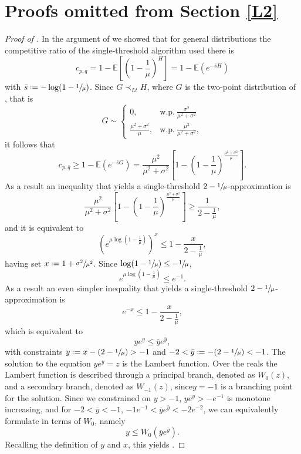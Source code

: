 \documentclass[11pt, a4paper, twoside]{article}
\newcommand*{\defeq}{\mathrel{\vcenter{\baselineskip0.5ex \lineskiplimit0pt
			\hbox{\scriptsize.}\hbox{\scriptsize.}}}=}
\newcommand{\EE}{\mathbb{E}}
\numberwithin{equation}{section}
\begin{document}
	\section{Proofs omitted from Section \ref{L2}}\label{suppL2}
	\begin{proof}[Proof of ]
		In the argument of  we showed that for general distributions the competitive ratio of the single-threshold algorithm used there is \[c_{p,\bar{q}}=1-\EE\left[\left(1-\frac{1}{\mu}\right)^H\right]=1-\EE\left( e^{-\bar{s}H}\right)\] with $\bar{s}\defeq-\log(1-\sfrac{1}{\mu})$. Since $G\prec_{Lt}H$, where $G$ is the two-point distribution of , that is
		\[G\sim\begin{cases}0,&\text{w.p.}\:\frac{\sigma^2}{\mu^2+\sigma^2}\\
			\frac{\mu^2+\sigma^2}{\mu},&\text{w.p.}\:\frac{\mu^2}{\mu^2+\sigma^2},\end{cases}\]
		it follows that
		\[c_{p,\bar{q}}\ge1-\EE\left( e^{-\bar{s}G}\right)=\frac{\mu^2}{\mu^2+\sigma^2}\left[1-\left(1-\frac{1}{\mu}\right)^\frac{\mu^2+\sigma^2}{\mu}\right].\]
		As a result an inequality that yields a single-threshold $2-\sfrac{1}{\mu}$-approximation is
		\[\frac{\mu^2}{\mu^2+\sigma^2}\left[1-\left(1-\frac{1}{\mu}\right)^\frac{\mu^2+\sigma^2}{\mu}\right]\ge\frac{1}{2-\frac{1}{\mu}},\]
		and it is equivalent to
		\begin{equation}\label{Lamb1}
			\left(e^{\mu\log\left(1-\frac{1}{\mu}\right)}\right)^{x}\le1-\frac{x}{2-\frac{1}{\mu}},
		\end{equation}
		having set $x\defeq1+\sfrac{\sigma^2}{\mu^2}$. Since $\log(1-\sfrac{1}{\mu})\le-\sfrac{1}{\mu}$,
		\[ e^{\mu\log\left(1-\frac{1}{\mu}\right)}\le e^{-1}.\] As a result an even simpler inequality that yields a single-threshold $2-\sfrac{1}{\mu}$-approximation is 	
		\begin{equation}\label{Lamb2}
			e^{-x}\le1-\frac{x}{2-\frac{1}{\mu}},
		\end{equation}
		which is equivalent to 
		\begin{equation}\label{Lamb3}
			ye^y\le\bar{y}e^{\bar{y}},
		\end{equation}
		with constraints $y\defeq x-(2-\sfrac{1}{\mu})>-1$ and $-2<\bar{y}\defeq-(2-\sfrac{1}{\mu})<-1$. The solution to the equation $ye^y=z$ is the Lambert function. Over the reals the Lambert function is described through a principal branch, denoted as $W_0(z)$, and a secondary branch, denoted as $W_{-1}(z)$, since$y=-1$ is a branching point for the solution. Since we constrained  on $y>-1$, $ye^y>-e^{-1}$ is monotone increasing, and for $-2<\bar{y}<-1$, $-1e^{-1}<\bar{y}e^{\bar{y}}<-2e^{-2}$, we can equivalently formulate  in terms of $W_0$, namely \[y\le W_0(\bar{y}e^{\bar{y}}).\] Recalling the definition of $y$ and $x$, this yields .\begin{comment}

\end{comment}
\end{proof}
\end{document}
